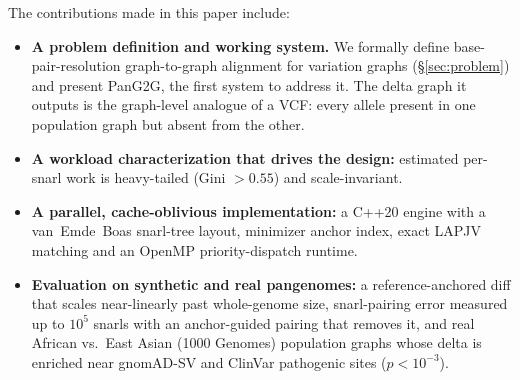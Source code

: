 The contributions made in this paper include:
\begin{itemize}
    \item \textbf{A problem definition and working system.} We formally define base-pair-resolution graph-to-graph alignment for variation graphs (\S\ref{sec:problem}) and present PanG2G, the first system to address it. The delta graph it outputs is the graph-level analogue of a VCF: every allele present in one population graph but absent from the other.
    \item \textbf{A workload characterization that drives the design:} estimated per-snarl work is heavy-tailed (Gini $>0.55$) and scale-invariant.
    \item \textbf{A parallel, cache-oblivious implementation:} a C++20 engine with a van~Emde~Boas snarl-tree layout, minimizer anchor index, exact LAPJV matching and an OpenMP priority-dispatch runtime.
    \item \textbf{Evaluation on synthetic and real pangenomes:} a reference-anchored diff that scales near-linearly past whole-genome size, snarl-pairing error measured up to $10^5$ snarls with an anchor-guided pairing that removes it, and real African vs.\ East Asian (1000 Genomes) population graphs whose delta is enriched near gnomAD-SV and ClinVar pathogenic sites ($p<10^{-3}$).
\end{itemize}

